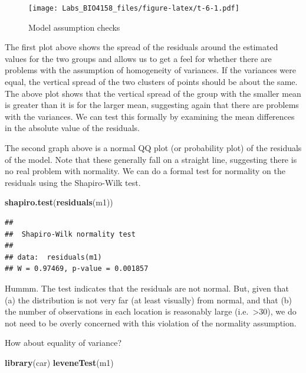 \documentclass[
  12pt,
]{book}
\newenvironment{Shaded}{\begin{snugshade}}{\end{snugshade}}
\newcommand{\KeywordTok}[1]{\textcolor[rgb]{0.13,0.29,0.53}{\textbf{#1}}}
\newcommand{\NormalTok}[1]{#1}
\begin{document}
\begin{figure}
\centering
\texttt{[image: Labs\_BIO4158\_files/figure-latex/t-6-1.pdf]}
\caption{\label{fig:t-6}Model assumption checks}
\end{figure}

The first plot above shows the spread of the residuals around the estimated values for the two groups and allows us to get a feel for whether there are problems with the assumption of homogeneity of variances. If the variances were equal, the vertical spread of the two clusters of points should be about the same. The above plot shows that the vertical spread of the group with the smaller mean is greater than it is for the larger mean, suggesting again that there are problems with the variances. We can test this formally by examining the mean differences in the absolute value of the residuals.

The second graph above is a normal QQ plot (or probability plot) of the residuals of the model. Note that these generally fall on a straight line, suggesting there is no real problem with normality. We can do a formal test for normality on the residuals using the Shapiro-Wilk test.

\begin{Shaded}
\begin{Highlighting}[]
\KeywordTok{shapiro.test}\NormalTok{(}\KeywordTok{residuals}\NormalTok{(m1))}
\end{Highlighting}
\end{Shaded}

\begin{verbatim}
## 
##  Shapiro-Wilk normality test
## 
## data:  residuals(m1)
## W = 0.97469, p-value = 0.001857
\end{verbatim}

Hummm. The test indicates that the residuals are not normal. But, given that (a) the distribution is not very far (at least visually) from normal, and that (b) the number of observations in each location is reasonably large (i.e.~\textgreater30), we do not need to be overly concerned with this violation of the normality assumption.

How about equality of variance?

\begin{Shaded}
\begin{Highlighting}[]
\KeywordTok{library}\NormalTok{(car)}
\KeywordTok{leveneTest}\NormalTok{(m1)}
\end{Highlighting}
\end{Shaded}
\end{document}
